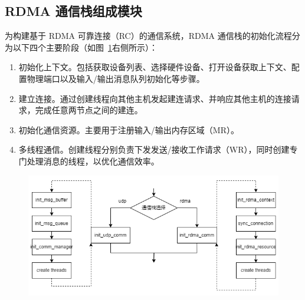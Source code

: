 {%






\subsection{RDMA 通信栈组成模块}

为构建基于 RDMA 可靠连接（RC）的通信系统，RDMA 通信栈的初始化流程分为以下四个主要阶段（如图~\ref{fig:mjiajia-rdma-modules}右侧所示）：
\begin{enumerate}[label=\arabic*.]
    \item 初始化上下文。包括获取设备列表、选择硬件设备、打开设备获取上下文、配置物理端口以及输入/输出消息队列初始化等步骤。
    \item 建立连接。通过创建线程向其他主机发起建连请求、并响应其他主机的连接请求，完成任意两节点之间的建连。
    \item 初始化通信资源。主要用于注册输入/输出内存区域（MR）。
    \item 多线程通信。创建线程分别负责下发发送/接收工作请求（WR），同时创建专门处理消息的线程，以优化通信效率。
\end{enumerate}

\begin{figure}[!htbp]
    \centering
    \includegraphics[width=\textwidth]{Img/RDMA-comm-modules.png}
    \label{fig:mjiajia-rdma-modules}
\end{figure}

}
